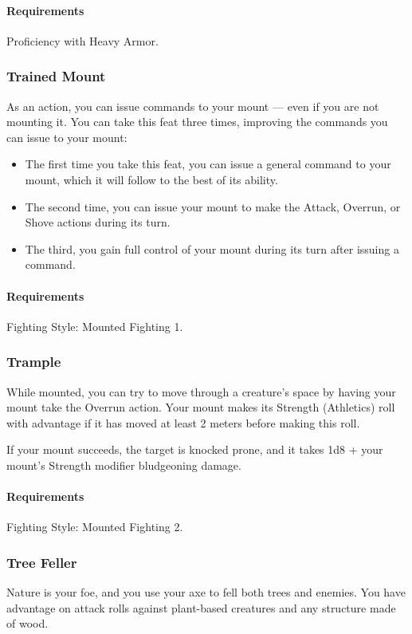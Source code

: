     \paragraph{Requirements} Proficiency with Heavy Armor.
\subsubsection{Trained Mount} \label{feat::trainedmount}
    As an action, you can issue commands to your mount --- even if you are not mounting it.
    You can take this feat three times, improving the commands you can issue to your mount:
    \begin{itemize}
        \item The first time you take this feat, you can issue a general command to your mount, which it will follow to the best of its ability.
        \item The second time, you can issue your mount to make the Attack, Overrun, or Shove actions during its turn.
        \item The third, you gain full control of your mount during its turn after issuing a command.
    \end{itemize}
    \paragraph{Requirements} Fighting Style: Mounted Fighting 1.
\subsubsection{Trample} \label{feat::trample}
    While mounted, you can try to move through a creature's space by having your mount take the Overrun action.
    Your mount makes its Strength (Athletics) roll with advantage if it has moved at least 2 meters before making this roll.

    If your mount succeeds, the target is knocked prone, and it takes 1d8 + your mount's Strength modifier bludgeoning damage.
    \paragraph{Requirements} Fighting Style: Mounted Fighting 2.
\subsubsection{Tree Feller} \label{feat::treefeller}
    Nature is your foe, and you use your axe to fell both trees and enemies.
    You have advantage on attack rolls against plant-based creatures and any structure made of wood.
